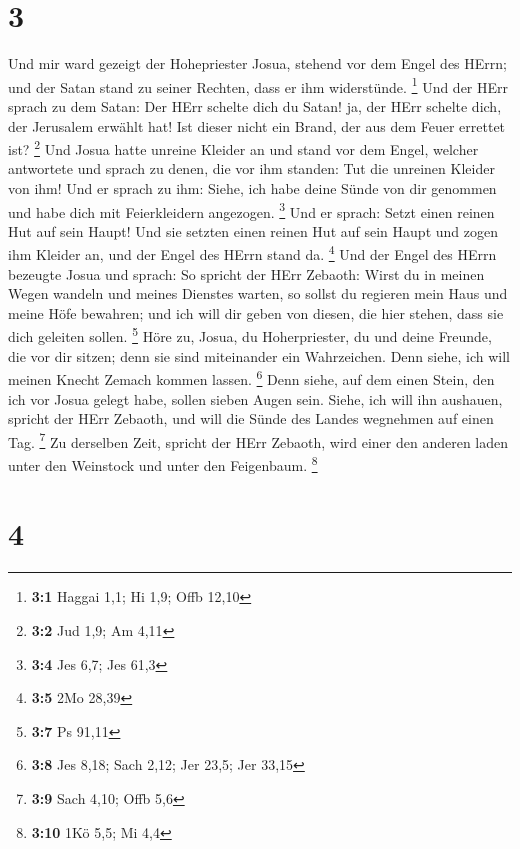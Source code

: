 \hypertarget{section-2}{%
\section{3}\label{section-2}}

 Und mir ward gezeigt der Hohepriester Josua, stehend vor
dem Engel des HErrn; und der Satan stand zu seiner Rechten, dass er ihm
widerstünde. \footnote{\textbf{3:1} Haggai 1,1; Hi 1,9; Offb 12,10}
 Und der HErr sprach zu dem Satan: Der HErr schelte dich
du Satan! ja, der HErr schelte dich, der Jerusalem erwählt hat! Ist
dieser nicht ein Brand, der aus dem Feuer errettet ist? \footnote{\textbf{3:2}
  Jud 1,9; Am 4,11}  Und Josua hatte unreine Kleider an
und stand vor dem Engel,  welcher antwortete und sprach zu
denen, die vor ihm standen: Tut die unreinen Kleider von ihm! Und er
sprach zu ihm: Siehe, ich habe deine Sünde von dir genommen und habe
dich mit Feierkleidern angezogen. \footnote{\textbf{3:4} Jes 6,7; Jes
  61,3}  Und er sprach: Setzt einen reinen Hut auf sein
Haupt! Und sie setzten einen reinen Hut auf sein Haupt und zogen ihm
Kleider an, und der Engel des HErrn stand da. \footnote{\textbf{3:5} 2Mo
  28,39}  Und der Engel des HErrn bezeugte Josua und
sprach:  So spricht der HErr Zebaoth: Wirst du in meinen
Wegen wandeln und meines Dienstes warten, so sollst du regieren mein
Haus und meine Höfe bewahren; und ich will dir geben von diesen, die
hier stehen, dass sie dich geleiten sollen. \footnote{\textbf{3:7} Ps
  91,11}  Höre zu, Josua, du Hoherpriester, du und deine
Freunde, die vor dir sitzen; denn sie sind miteinander ein Wahrzeichen.
Denn siehe, ich will meinen Knecht Zemach kommen lassen. \footnote{\textbf{3:8}
  Jes 8,18; Sach 2,12; Jer 23,5; Jer 33,15}  Denn siehe,
auf dem einen Stein, den ich vor Josua gelegt habe, sollen sieben Augen
sein. Siehe, ich will ihn aushauen, spricht der HErr Zebaoth, und will
die Sünde des Landes wegnehmen auf einen Tag. \footnote{\textbf{3:9}
  Sach 4,10; Offb 5,6}  Zu derselben Zeit, spricht der
HErr Zebaoth, wird einer den anderen laden unter den Weinstock und unter
den Feigenbaum. \footnote{\textbf{3:10} 1Kö 5,5; Mi 4,4}

\hypertarget{section-3}{%
\section{4}\label{section-3}}

